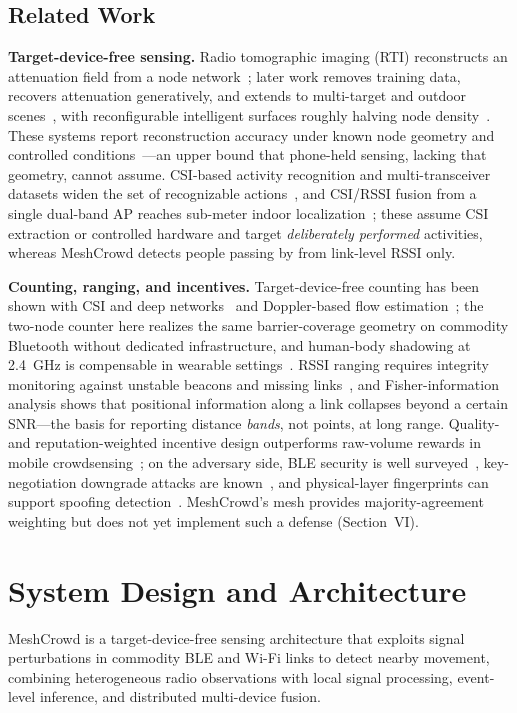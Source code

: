 \documentclass[journal,10pt]{IEEEtran}
\begin{document}
\subsection{Related Work}
\textbf{Target-device-free sensing.} Radio tomographic imaging (RTI)
reconstructs an attenuation field from a node network~\cite{wilson2010};
later work removes training data, recovers attenuation generatively, and
extends to multi-target and outdoor scenes~\cite{alippi2016,wu2024}, with
reconfigurable intelligent surfaces roughly halving node
density~\cite{li2024}. These systems report reconstruction accuracy under
known node geometry and controlled conditions~\cite{wilson2011}---an upper
bound that phone-held sensing, lacking that geometry, cannot assume. CSI-based
activity recognition and multi-transceiver datasets widen the set of
recognizable actions~\cite{wang2015har,wong2024}, and CSI/RSSI fusion from a
single dual-band AP reaches sub-meter indoor localization~\cite{sanchez2020};
these assume CSI extraction or controlled hardware and target \emph{deliberately
performed} activities, whereas MeshCrowd detects people passing by from
link-level RSSI only.

\textbf{Counting, ranging, and incentives.} Target-device-free counting has
been shown with CSI and deep networks~\cite{khan2023} and Doppler-based flow
estimation~\cite{zhou2020}; the two-node counter here realizes the same
barrier-coverage geometry on commodity Bluetooth without dedicated
infrastructure, and human-body shadowing at 2.4~GHz is compensable in
wearable settings~\cite{januszkiewicz2018}. RSSI ranging requires integrity
monitoring against unstable beacons and missing links~\cite{ramirez2021}, and
Fisher-information analysis shows that positional information along a link
collapses beyond a certain SNR---the basis for reporting distance \emph{bands},
not points, at long range. Quality- and reputation-weighted incentive design
outperforms raw-volume rewards in mobile crowdsensing~\cite{zhang2022,wang2018};
on the adversary side, BLE security is well surveyed~\cite{casar2022},
key-negotiation downgrade attacks are known~\cite{antonioli2020}, and
physical-layer fingerprints can support spoofing
detection~\cite{ryan2013woot}. MeshCrowd's mesh provides majority-agreement
weighting but does not yet implement such a defense (Section~VI).

\section{System Design and Architecture}
MeshCrowd is a target-device-free sensing architecture that exploits signal
perturbations in commodity BLE and Wi-Fi links to detect nearby movement,
combining heterogeneous radio observations with local signal processing,
event-level inference, and distributed multi-device fusion.
\end{document}
